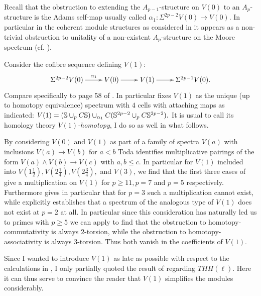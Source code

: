 Recall that the obstruction to extending the $A_{p-1}$-structure on $V(0)$ to
an $A_p$-structure is the Adams self-map usually called 
$\alpha_1\colon \Sigma^{2p-2}V(0)\rightarrow V(0)$. In particular in the
coherent module structures as considered in \cite{SchV0} it appears as a
non-trivial obstruction to unitality of a non-existent $A_p$-structure on
the Moore spectrum (cf. \cite[Theorem 2.5]{SchV0}).

Consider the cofibre sequence defining $V(1)$:
\[\xymatrix{\Sigma^{2p-2}V(0)\ar[r]^-{\alpha_1}& V(0)\ar[r]
& V(1)\ar[r] & \Sigma^{2p-1}V(0).}\] Compare specifically to
page 58 of \cite{Toda}. In particular \cite[Theorem 4.1]{Toda} fixes
$V(1)$ as the unique (up to homotopy equivalence) spectrum with
$4$ cells with attaching maps as indicated:
$V(1)=(\S\cup_pC\S)\cup_{\alpha_1}C(\S^{2p-2}\cup_p C\S^{2p-2}).$
It is usual to call its homology theory \emph{$V(1)$-homotopy}, 
I do so as well in what follows.

By considering $V(0)$ and $V(1)$ as part of a family of spectra
$V(a)$ with inclusions $V(a)\rightarrow V(b)$ for $a<b$ Toda 
identifies multiplicative pairings of the form $V(a)\wedge V(b)
\rightarrow V(c)$ with $a,b\leq c$. In particular for $V(1)$ 
included into $V(1\frac12),V(2\frac14),V(2\frac34),$ and $V(3)$,
we find that the first three cases of \cite[Theorem 4.4]{Toda} give
a multiplication on $V(1)$ for $p\geq 11, p=7$ and $p=5$ respectively.
Furthermore \cite[Theorem 6.3]{Toda} gives in particular that for
$p=3$ such a multiplication cannot exist, while \cite[Theorem 6.1]{Toda}
explicitly establishes that a spectrum of the analogous type of
$V(1)$ does not exist at $p=2$ at all. In particular since this
consideration has naturally led us to primes with $p\geq 5$ we
can apply \cite{Oka} to find that the obstruction to 
homotopy-commutativity is always $2$-torsion, while the obstruction
to homotopy-associativity is always $3$-torsion. Thus both vanish
in the coefficients of $V(1)$.

Since I wanted to introduce $V(1)$ as late as possible with respect
to the calculations in \cite{AuTHH}, I only partially quoted the 
result of \cite{MS} regarding $THH(\ell).$ Here it can thus serve to
convince the reader that $V(1)$ simplifies the modules considerably.

{}

